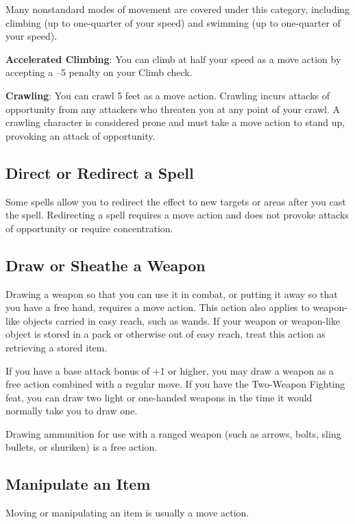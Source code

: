 Many nonstandard modes of movement are covered under this category, including climbing (up to one-quarter of your speed) and swimming (up to one-quarter of your speed).
				
\textbf{Accelerated Climbing}: You can climb at half your speed as a move action by accepting a --5 penalty on your Climb check.
				
\textbf{Crawling}: You can crawl 5 feet as a move action. Crawling incurs attacks of opportunity from any attackers who threaten you at any point of your crawl. A crawling character is considered prone and must take a move action to stand up, provoking an attack of opportunity.
				
\subsection{Direct or Redirect a Spell}

				
Some spells allow you to redirect the effect to new targets or areas after you cast the spell. Redirecting a spell requires a move action and does not provoke attacks of opportunity or require concentration.
				
\subsection{Draw or Sheathe a Weapon}

				
Drawing a weapon so that you can use it in combat, or putting it away so that you have a free hand, requires a move action. This action also applies to weapon-like objects carried in easy reach, such as wands. If your weapon or weapon-like object is stored in a pack or otherwise out of easy reach, treat this action as retrieving a stored item.
				
If you have a base attack bonus of +1 or higher, you may draw a weapon as a free action combined with a regular move. If you have the Two-Weapon Fighting feat, you can draw two light or one-handed weapons in the time it would normally take you to draw one.
				
Drawing ammunition for use with a ranged weapon (such as arrows, bolts, sling bullets, or shuriken) is a free action.
				
\subsection{Manipulate an Item}

				
Moving or manipulating an item is usually a move action.
				

